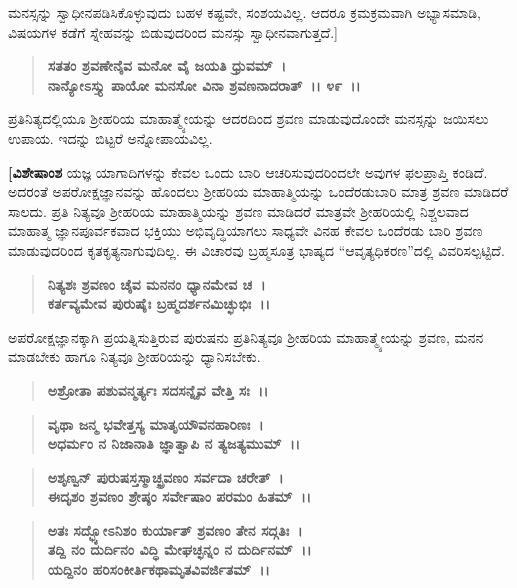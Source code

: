 ಮನಸ್ಸನ್ನು ಸ್ವಾಧೀನಪಡಿಸಿಕೊಳ್ಳುವುದು ಬಹಳ ಕಷ್ಟವೇ, ಸಂಶಯವಿಲ್ಲ. ಆದರೂ ಕ್ರಮಕ್ರಮವಾಗಿ ಅಭ್ಯಾಸಮಾಡಿ, ವಿಷಯಗಳ ಕಡೆಗೆ ಸ್ನೇಹವನ್ನು ಬಿಡುವುದರಿಂದ ಮನಸ್ಸು ಸ್ವಾಧೀನವಾಗುತ್ತದೆ.]

\begin{verse}
\textbf{ಸತತಂ ಶ್ರವಣೇನೈವ ಮನೋ ವೈ ಜಯತಿ ಧ್ರುವಮ್~।}\\\textbf{ನಾನ್ಯೋಽಸ್ತ್ಯು ಪಾಯೋ ಮನಸೋ ವಿನಾ ಶ್ರವಣನಾದರಾತ್~।। ೪೯~।।}
\end{verse}

ಪ್ರತಿನಿತ್ಯದಲ್ಲಿಯೂ ಶ‍್ರೀಹರಿಯ ಮಾಹಾತ್ಮ್ಯೇಯನ್ನು ಆದರದಿಂದ ಶ್ರವಣ ಮಾಡುವುದೊಂದೇ ಮನಸ್ಸನ್ನು ಜಯಿಸಲು ಉಪಾಯ. ಇದನ್ನು ಬಿಟ್ಟರೆ ಅನ್ನೋಪಾಯವಿಲ್ಲ.

\textbf{[ವಿಶೇಷಾಂಶ\enginline{-}} ಯಜ್ಞ ಯಾಗಾದಿಗಳನ್ನು ಕೇವಲ ಒಂದು ಬಾರಿ ಆಚರಿಸುವುದರಿಂದಲೇ ಅವುಗಳ ಫಲಪ್ರಾಪ್ತಿ ಕಂಡಿದೆ. ಅದರಂತೆ ಅಪರೋಕ್ಷಜ್ಞಾನವನ್ನು ಹೊಂದಲು ಶ‍್ರೀಹರಿಯ ಮಾಹಾತ್ಮಿಯನ್ನು ಒಂದೆರಡುಬಾರಿ ಮಾತ್ರ ಶ್ರವಣ ಮಾಡಿದರೆ ಸಾಲದು. ಪ್ರತಿ ನಿತ್ಯವೂ ಶ‍್ರೀಹರಿಯ ಮಾಹಾತ್ಮಿಯನ್ನು ಶ್ರವಣ ಮಾಡಿದರೆ ಮಾತ್ರವೇ ಶ‍್ರೀಹರಿಯಲ್ಲಿ ನಿಶ್ಚಲವಾದ ಮಾಹಾತ್ಮ ಜ್ಞಾನಪೂರ್ವಕವಾದ ಭಕ್ತಿಯು ಅಭಿವೃದ್ಧಿಯಾಗಲು ಸಾಧ್ಯವೇ ವಿನಹ ಕೇವಲ ಒಂದೆರಡು ಬಾರಿ ಶ್ರವಣ ಮಾಡುವುದರಿಂದ ಕೃತಕೃತ್ಯನಾಗುವುದಿಲ್ಲ. ಈ ವಿಚಾರವು ಬ್ರಹ್ಮಸೂತ್ರ ಭಾಷ್ಯದ “ಆವೃತ್ಯಧಿಕರಣ”ದಲ್ಲಿ ವಿವರಿಸಲ್ಪಟ್ಟಿದೆ.

\begin{verse}
\textbf{ನಿತ್ಯಶಃ ಶ್ರವಣಂ ಚೈವ ಮನನಂ ಧ್ಯಾನಮೇವ ಚ~।}\\\textbf{ಕರ್ತವ್ಯಮೇವ ಪುರುಷೈಃ ಬ್ರಹ್ಮದರ್ಶನಮಿಚ್ಛುಭಿಃ~।।} 
\end{verse}

ಅಪರೋಕ್ಷಜ್ಞಾನಕ್ಕಾಗಿ ಪ್ರಯತ್ನಿಸುತ್ತಿರುವ ಪುರುಷನು ಪ್ರತಿನಿತ್ಯವೂ ಶ‍್ರೀಹರಿಯ ಮಾಹಾತ್ಮ್ಯೇಯನ್ನು ಶ್ರವಣ, ಮನನ ಮಾಡಬೇಕು ಹಾಗೂ ನಿತ್ಯವೂ ಶ‍್ರೀಹರಿಯನ್ನು ಧ್ಯಾನಿಸಬೇಕು.

\begin{verse}
\textbf{ಅಶ್ರೋತಾ ಪಶುವನ್ಮರ್ತ್ಯಃ ಸದಸನ್ನೈವ ವೇತ್ತಿ ಸಃ~।।} 
\end{verse}

\begin{verse}
\textbf{ವೃಥಾ ಜನ್ಮ ಭವೇತ್ತಸ್ಯ ಮಾತೃಯೌವನಹಾರಿಣಃ~।}\\\textbf{ಅಧರ್ಮಂ ನ ನಿಜಾನಾತಿ ಜ್ಞಾತ್ವಾಪಿ ನ ತ್ಯಜತ್ಯಮುಮ್~।। }
\end{verse}

\begin{verse}
\textbf{ಅಶೃಣ್ವನ್ ಪುರುಷಸ್ತಸ್ಮಾಚ್ಛ್ರವಣಂ ಸರ್ವದಾ ಚರೇತ್~।}\\\textbf{ಈದೃಶಂ ಶ್ರವಣಂ ಶ್ರೇಷ್ಠಂ ಸರ್ವೇಷಾಂ ಪರಮಂ ಹಿತಮ್~।। }
\end{verse}

\begin{verse}
\textbf{ಅತಃ ಸದ್ಭ್ಯೋಽನಿಶಂ ಕುರ್ಯಾತ್ ಶ್ರವಣಂ ತೇನ ಸದ್ಗತಿಃ~।}\\\textbf{ತದ್ದಿ ನಂ ದುರ್ದಿನಂ ವಿದ್ಧಿ ಮೇಘಚ್ಛನ್ನಂ ನ ದುರ್ದಿನಮ್~।। }\\\textbf{ಯದ್ದಿನಂ ಹರಿಸಂಕೀರ್ತಿಕಥಾಮೃತವಿವರ್ಜಿತಮ್~।।} 
\end{verse}

